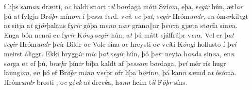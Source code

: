  í liþs sam\textit{an} drætti, 
o\textit{c} haldi sn\textit{ar}t   t\textit{il} b\textit{ar}daga   móti   Sví\textit{om}, eþa, s\textit{egir} hún, ætl\textit{ar} þú a\textit{t}
fylgja Br\textit{óþr} mín\textit{om} í þ\textit{ess}a f\textit{er}d.  
 v\textit{ei}t e\textit{c} þ\textit{at}, s\textit{egir} Hróm\textit{undr},
e\textit{n} óm\textit{er}kil\textit{e}gt   a\textit{t} sitja a\textit{t} gj\textit{ỏr}þalaus f\textit{yrir} góþa m\textit{enn} n\textit{ær} gran\textit{n}||ar þ\textit{eir}ra gjæta st\textit{ar}fa sin\textit{n}a. 
Enga bón nen\textit{n}i e\textit{c}  f\textit{yrir} K\textit{óng} s\textit{egir} hún, a\textit{t} þú mátt
sjálfráþr v\textit{er}a. 
Vel er þ\textit{at} s\textit{egir} Hróm\textit{undr}   
þ\textit{ei}r Bíldr o\textit{c} Vole   sína   
o\textit{c} hreysti  
 o\textit{c} v\textit{ei}ti K\textit{óng}i hollusto í þ\textit{ví}   meirst áliggr. 
Ekki hrygg\textit{ir} m\textit{ic} þ\textit{at} s\textit{egir} hún, þó þ\textit{ei}r   neyta h\textit{an}da sin\textit{n}a, en\textit{n} s\textit{or}ga e\textit{c}  ef þú,   b\textit{ræþ}r þín\textit{ir} bíþa kaldt af þ\textit{ess}\textit{om} b\textit{ar}daga, þ\textit{ví} mér rís hugr    laung\textit{om}, e\textit{n} þó ef   Br\textit{óþr} m\textit{inn} v\textit{er}þr ofr liþa b\textit{or}in\textit{n}, þá kan\textit{n}
sæmd   a\textit{t} ósóma.  
Hróm\textit{undr} brosti  , 
o\textit{c} gé\textit{ck} a\textit{t} dre\textit{ck}a,     
h\textit{ann} heim   t\textit{il} F\textit{ỏþr} síns.  
\pend 
\endnumbering 
\beginnumbering 
\pstart  
\vspace{5mm}
